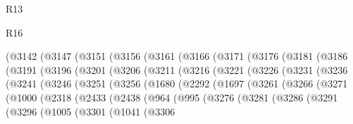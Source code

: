 \begin{lexlean}{R13}
\begin{lexlean}{R16}
\begin{coremodule}
{{{{{{{{{{{{{{{{{{{{{{{{{{{{{{{{{{{{{{{{{{{{{{{{{{{{{{{{{{{{{{{{{{{{{{{{{{{{{{{{{{{{{{{{{{{{{{{{{{{{{{{{{{{{{{{{{        (@3142
          (@3147
            (@3151
              (@3156
                (@3161
                  (@3166
                    (@3171
                      (@3176
                        (@3181
                          (@3186
                            (@3191
                              (@3196
                                (@3201
                                  (@3206
                                    (@3211
                                      (@3216
                                        (@3221
                                          (@3226
                                            (@3231
                                              (@3236
                                                (@3241
                                                  (@3246
                                                    (@3251
                                                      (@3256
                                                        (@1680
                                                          (@2292
                                                            (@1697
                                                              (@3261
                                                                (@3266
                                                                  (@3271
                                                                    (@1000
                                                                      (@2318
                                                                        (@2433
                                                                          (@2438
                                                                            (@964
                                                                              (@995
                                                                                (@3276
                                                                                  (@3281
                                                                                    (@3286
                                                                                      (@3291
                                                                                        (@3296
                                                                                          (@1005
                                                                                            (@3301
                                                                                              (@1041
                                                                                                (@3306
}}}}}}}}}}}}}}}}}}}}}}}}}}}}}}}}}}}}}}}}}}}}}}}}}}}}}}}}}}}}}}}}}}}}}}}}}}}}}}}}}}}}}}}}}}}}}}}}}}}}}}}}}}}}}}}}}
\end{coremodule}
\end{lexlean}
\end{lexlean}
